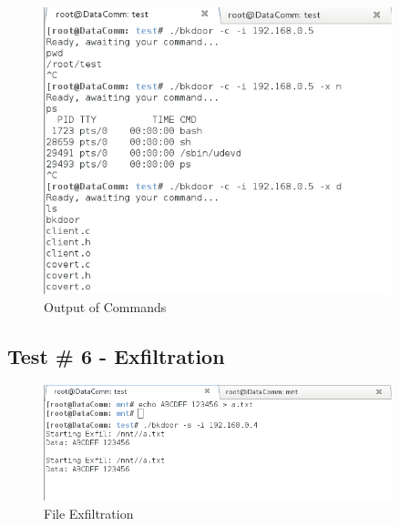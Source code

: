 \documentclass[titlepage]{article}
\begin{document}
\begin{figure}[htb]                                                                       
  \begin{center}
    \includegraphics[width=0.9\textwidth]{Pictures/Commands.png}
  \end{center}
  \caption{Output of Commands}
  \label{fig:commands}
\end{figure}

\clearpage

\subsection{Test \# 6 - Exfiltration}

\begin{figure}[htb]                                                                       
  \begin{center}
    \includegraphics[width=0.9\textwidth]{Pictures/Exfiltration.png}
  \end{center}
  \caption{File Exfiltration}
  \label{fig:exfiltration}
\end{figure}

\clearpage
\end{document}
